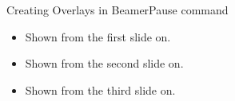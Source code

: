 \documentclass{beamer}
\begin{document}
\begin{frame}{Creating Overlays in Beamer}{Pause command}

\begin{itemize}
    \item Shown from the first slide on.
\pause
    \item Shown from the second slide on.
\pause
    \item Shown from the third slide on.
\end{itemize}

\end{frame}
\end{document}
